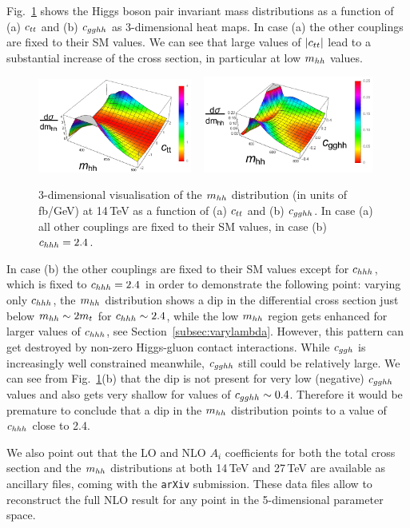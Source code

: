 Fig.~\ref{fig:ctt_3D} shows the Higgs boson pair invariant mass
distributions as a function of (a) $c_{tt}$ and (b) $c_{gghh}$ as 3-dimensional heat maps.
In case (a) the other couplings are fixed to their SM values.
We can see that large values of $|c_{tt}|$ lead to a substantial increase of the cross section, in particular at low $m_{hh}$ values.
%  
\begin{figure}[ht]
\begin{center}
  \includegraphics[width=0.45\textwidth]{section3/plots/3D_mhh_ctt.pdf}    
~
\includegraphics[width=0.5\textwidth]{section3/plots/3D_mhh_cgghh_lam24.pdf}
\end{center}
\caption{3-dimensional visualisation of the $m_{hh}$ distribution (in units of fb/GeV) at 14\,TeV as a function of (a) $c_{tt}$  and (b) $c_{gghh}$.  In case (a) all
other couplings are fixed to their SM values, in case (b) $c_{hhh}= 2.4$.}
\label{fig:ctt_3D}
\end{figure}
In case (b) the other couplings are fixed to their SM values except for $c_{hhh}$, which is fixed to $c_{hhh}=2.4$
in order to demonstrate the following point: varying only $c_{hhh}$, the $m_{hh}$ distribution shows a dip in the differential cross section just below $m_{hh}\sim 2m_t$ for $c_{hhh}\sim 2.4$, while the low $m_{hh}$ region gets enhanced for larger values of $c_{hhh}$, see Section~\ref{subsec:varylambda}.
 However, this pattern can get destroyed by non-zero
 Higgs-gluon contact interactions. While $c_{ggh}$ is increasingly well constrained meanwhile,
 $c_{gghh}$ still could be relatively large. We can see from Fig.~\ref{fig:ctt_3D}(b) that the dip is not present for very low (negative) $c_{gghh}$ values and also gets very shallow for values of $c_{gghh}\sim 0.4$.
 Therefore it would be premature to conclude that a dip in the $m_{hh}$ distribution points to a value of $c_{hhh}$ close to 2.4.

We also point out that the LO and NLO $A_i$ coefficients for both the total cross
section and the $m_{hh}$ distributions at both 14\,TeV and 27\,TeV are
available as ancillary files, coming with the {\tt arXiv} submission. These data files allow to reconstruct the full NLO result for any point in the 5-dimensional parameter space.



